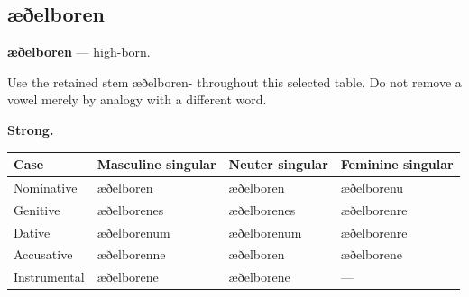 \subsection*{æðelboren}

\par\begin{minipage}{\linewidth}\raggedright
\textbf{æðelboren} — high-born.

Use the retained stem æðelboren- throughout this selected table. Do not remove a vowel merely by analogy with a different word.

\textbf{Strong.}

\par\begingroup
\fontsize{10.5}{13.2}\selectfont
\par\begin{minipage}{\linewidth}\raggedright
\setlength{\LTleft}{0pt}\setlength{\LTright}{\fill}
\noindent
\begin{tabular}{@{}>{\raggedright\arraybackslash}p{22mm}>{\raggedright\arraybackslash}p{31.18mm}>{\raggedright\arraybackslash}p{31.18mm}>{\raggedright\arraybackslash}p{31.18mm}@{}}
\toprule
\textbf{Case} & \textbf{Masculine singular} & \textbf{Neuter singular} & \textbf{Feminine singular} \\
\midrule
Nominative & æðelboren & æðelboren & æðelborenu \\
Genitive & æðelborenes & æðelborenes & æðelborenre \\
Dative & æðelborenum & æðelborenum & æðelborenre \\
Accusative & æðelborenne & æðelboren & æðelborene \\
Instrumental & æðelborene & æðelborene & — \\
\bottomrule
\end{tabular}
\end{minipage}\par
\par\endgroup
\end{minipage}\par
\par\addvspace{5pt}
\par\begingroup

